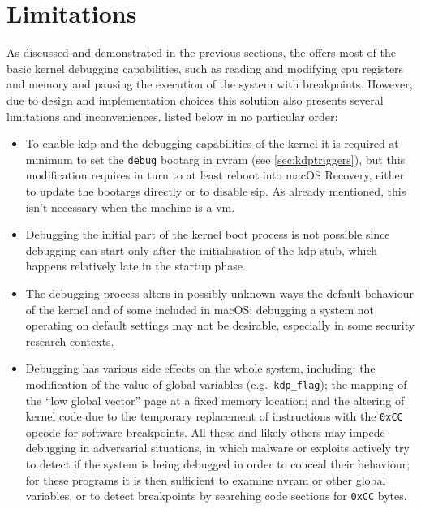 \section{Limitations}\label{sec:kdplimitations}
As discussed and demonstrated in the previous sections, the  offers most of the basic kernel debugging capabilities, such as reading and modifying \gls{cpu} registers and memory and pausing the execution of the system with breakpoints. However, due to design and implementation choices this solution also presents several limitations and inconveniences, listed below in no particular order:
\begin{itemize}
    \item To enable \gls{kdp} and the debugging capabilities of the kernel it is required at minimum to set the \lstinline{debug} \gls{bootarg} in \gls{nvram} (see \cref{sec:kdptriggers}), but this modification requires in turn to at least reboot into macOS Recovery, either to update the \glspl{bootarg} directly or to disable \gls{sip}. As already mentioned, this isn't necessary when the machine is a \gls{vm}.

    \item Debugging the initial part of the kernel boot process is not possible since debugging can start only after the initialisation of the \gls{kdp} stub, which happens relatively late in the startup phase.

    \item The debugging process alters in possibly unknown ways the default behaviour of the kernel and of some  included in macOS; debugging a system not operating on default settings may not be desirable, especially in some security research contexts.

    \item Debugging has various side effects on the whole system, including: the modification of the value of global variables (e.g.\ \lstinline{kdp_flag}); the mapping of the \enquote{low global vector} page at a fixed memory location; and the altering of kernel code due to the temporary replacement of instructions with the \lstinline{0xCC} opcode for software breakpoints. All these and likely others may impede debugging in adversarial situations, in which malware or exploits actively try to detect if the system is being debugged in order to conceal their behaviour; for these programs it is then sufficient to examine \gls{nvram} or other global variables, or to detect breakpoints by searching code sections for \lstinline{0xCC} bytes.


\end{itemize}
